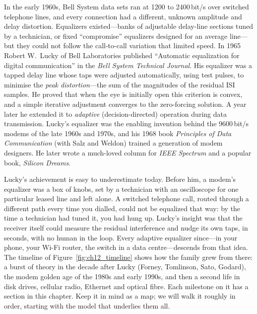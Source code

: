 
\begin{history}
In the early 1960s, Bell System data sets ran at 1200 to 2400\,bit/s over switched telephone lines,
and every connection had a different, unknown amplitude and delay distortion. Equalizers
existed---banks of adjustable delay-line sections tuned by a technician, or fixed ``compromise''
equalizers designed for an average line---but they could not follow the call-to-call variation
that limited speed. In 1965 Robert W.~Lucky of Bell Laboratories published ``Automatic
equalization for digital communication'' in the \emph{Bell System Technical Journal}. His
equalizer was a tapped delay line whose taps were adjusted automatically, using test pulses, to
minimise the \emph{peak distortion}---the sum of the magnitudes of the residual ISI samples. He
proved that when the eye is initially open this criterion is convex, and a simple iterative
adjustment converges to the zero-forcing solution. A year later he extended it to
\emph{adaptive} (decision-directed) operation during data transmission. Lucky's equalizer was the
enabling invention behind the 9600\,bit/s modems of the late 1960s and 1970s, and his 1968 book
\emph{Principles of Data Communication} (with Salz and Weldon) trained a generation of modem
designers. He later wrote a much-loved column for \emph{IEEE Spectrum} and a popular book,
\emph{Silicon Dreams}.
\end{history}


Lucky's achievement is easy to underestimate today. Before him, a modem's equalizer was a box
of knobs, set by a technician with an oscilloscope for one particular leased line and left
alone. A switched telephone call, routed through a different path every time you dialled, could
not be equalized that way: by the time a technician had tuned it, you had hung up. Lucky's
insight was that the receiver itself could measure the residual interference and nudge its own
taps, in seconds, with no human in the loop. Every adaptive equalizer since---in your phone, your
Wi-Fi router, the switch in a data centre---descends from that idea. The timeline of
Figure~\ref{fig:ch12_timeline} shows how the family grew from there: a burst of theory in the
decade after Lucky (Forney, Tomlinson, Sato, Godard), the modem golden age of the 1980s and early
1990s, and then a second life in disk drives, cellular radio, Ethernet and optical
fibre. Each milestone on it has a section in this chapter. Keep it in mind as a map; we will walk
it roughly in order, starting with the model that underlies them all.


